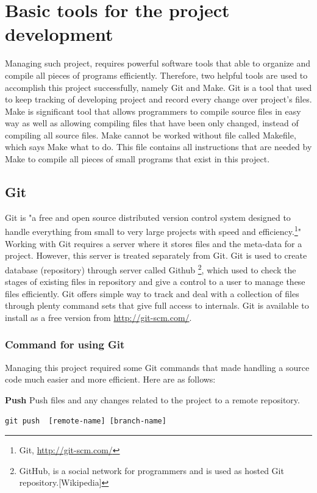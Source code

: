 \documentclass[11pt]{report}
\begin{document}
\chapter{Basic tools for the project development}
\label{cha: tools}
Managing such project, requires powerful software tools that able to organize and compile all pieces of programs efficiently. Therefore, two helpful tools are used to accomplish this project successfully, namely Git and Make. Git is a tool that used to keep tracking of developing project and record every change over project's files. Make is significant tool that allows programmers to compile source files in easy way as well as allowing compiling files that have been only changed, instead of compiling all source files. Make cannot be worked without file called Makefile, which says Make what to do. This file contains all instructions that are needed by Make to compile all pieces of small programs that exist in this project.

\section{Git}
\label{sec: Git}
Git is "a free and open source distributed version control system designed to handle everything from small to very large projects with speed and efficiency.\footnote{Git, \url{http://git-scm.com/}}"  Working with Git requires a server where it stores files and the meta-data for a project. However, this server is treated separately from Git.  Git is used to create database (repository) through server called Github \footnote{GitHub, is a social network for programmers and is used as hosted Git repository.[Wikipedia]}, which used to check the stages of existing files in repository and give a control to a user to manage these files efficiently. Git offers simple way to track and deal with a collection of files through plenty command sets that give full access to internals. Git is available to install as a free version from  \url{http://git-scm.com/}.


\subsection{Command for using Git}
\label{subsec: Command for using Git}
Managing this project required some Git commands that made handling a source code much easier and more efficient. Here are as follows:

\textbf{Push} Push files and any changes related to the project  to a remote repository.
\begin{verbatim}
git push  [remote-name] [branch-name]
\end{verbatim}
\end{document}
